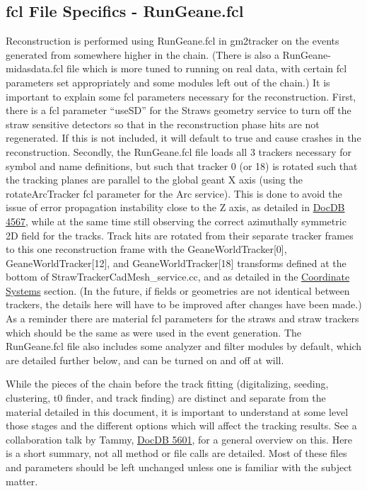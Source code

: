   \subsection{fcl File Specifics - RunGeane.fcl} 

    Reconstruction is performed using RunGeane.fcl in gm2tracker on the events generated from somewhere higher in the chain. (There is also a RunGeane-midasdata.fcl file which is more tuned to running on real data, with certain fcl parameters set appropriately and some modules left out of the chain.) It is important to explain some fcl parameters necessary for the reconstruction. First, there is a fcl parameter ``useSD'' for the Straws geometry service to turn off the straw sensitive detectors so that in the reconstruction phase hits are not regenerated. If this is not included, it will default to true and cause crashes in the reconstruction. Secondly, the RunGeane.fcl file loads all 3 trackers necessary for symbol and name definitions, but such that tracker 0 (or 18) is rotated such that the tracking planes are parallel to the global geant X axis (using the rotateArcTracker fcl parameter for the Arc service). This is done to avoid the issue of error propagation instability close to the Z axis, as detailed in \href{http://gm2-docdb.fnal.gov:8080/cgi-bin/ShowDocument?docid=4567}{DocDB 4567}, while at the same time still observing the correct azimuthally symmetric 2D field for the tracks. Track hits are rotated from their separate tracker frames to this one reconstruction frame with the GeaneWorldTracker[0], GeaneWorldTracker[12], and GeaneWorldTracker[18] transforms defined at the bottom of StrawTrackerCadMesh\_service.cc, and as detailed in the \hyperref[sec:Coord]{Coordinate Systems} section. (In the future, if fields or geometries are not identical between trackers, the details here will have to be improved after changes have been made.) As a reminder there are material fcl parameters for the straws and straw trackers which should be the same as were used in the event generation. The RunGeane.fcl file also includes some analyzer and filter modules by default, which are detailed further below, and can be turned on and off at will.

    While the pieces of the chain before the track fitting (digitalizing, seeding, clustering, t0 finder, and track finding) are distinct and separate from the material detailed in this document, it is important to understand at some level those stages and the different options which will affect the tracking results. See a collaboration talk by Tammy, \href{http://gm2-docdb.fnal.gov:8080/cgi-bin/ShowDocument?docid=5601}{DocDB 5601}, for a general overview on this. Here is a short summary, not all method or file calls are detailed. Most of these files and parameters should be left unchanged unless one is familiar with the subject matter.

